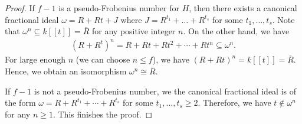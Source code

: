 \documentclass[10pt,a4paper]{amsart}
\begin{document}
\begin{proof}
    If $f-1$ is a pseudo-Frobenius number for $H$, then there exists a canonical fractional ideal $\omega = R + Rt + J$ where $J = R^{t_1} + \ldots + R^{t_s}$ for some $t_1, \ldots, t_s$. Note that $\omega^n \subseteq k[[t]] = \overline{R}$ for any positive integer $n$. On the other hand, we have 
    \begin{align*}
    (R+R^t)^n = R + Rt + Rt^2 + \cdots + Rt^n \subseteq \omega^n.
    \end{align*}
    For large enough $n$ (we can choose $n \leq f$), we have $(R+Rt)^n = k[[t]] = \overline{R}$. Hence, we obtain an isomorphism $\omega^n \cong \overline{R}$.

    If $f-1$ is not a pseudo-Frobenius number, we the canonical fractional ideal is of the form $\omega = R + R^{t_1} + \cdots + R^{t_s}$ for some $t_1, \ldots, t_s \geq 2$. Therefore, we have $t \notin \omega^n$ for any $n \geq 1$. This finishes the proof. 
\end{proof}
\end{document}
